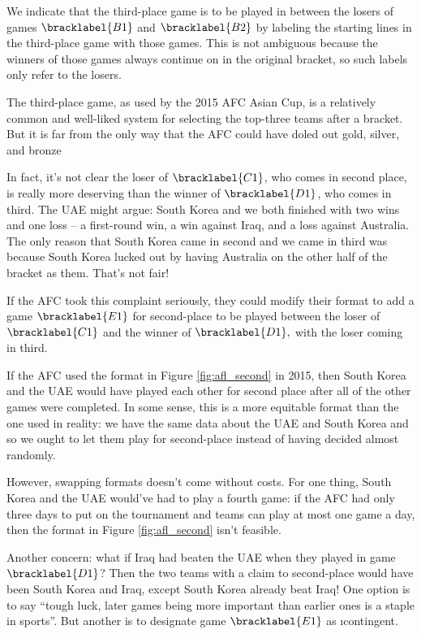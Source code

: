 {    We indicate that the third-place game is to be played in between the losers of games $\bracklabel{B1}$ and $\bracklabel{B2}$ by labeling the starting lines in the third-place game with those games. This is not ambiguous because the winners of those games always continue on in the original bracket, so such labels only refer to the losers.

    The third-place game, as used by the 2015 AFC Asian Cup, is a relatively common and well-liked system for selecting the top-three teams after a bracket. But it is far from the only way that the AFC could have doled out gold, silver, and bronze
    
    In fact, it's not clear the loser of $\bracklabel{C1}$, who comes in second place, is really more deserving than the winner of $\bracklabel{D1}$, who comes in third. The UAE might argue: South Korea and we both finished with two wins and one loss -- a first-round win, a win against Iraq, and a loss against Australia. The only reason that South Korea came in second and we came in third was because South Korea lucked out by having Australia on the other half of the bracket as them. That's not fair!

    If the AFC took this complaint seriously, they could modify their format to add a game $\bracklabel{E1}$ for second-place to be played between the loser of $\bracklabel{C1}$ and the winner of $\bracklabel{D1},$ with the loser coming in third.


    If the AFC used the format in Figure \ref{fig:afl_second} in 2015, then South Korea and the UAE would have played each other for second place after all of the other games were completed. In some sense, this is a more equitable format than the one used in reality: we have the same data about the UAE and South Korea and so we ought to let them play for second-place instead of having decided almost randomly.

    However, swapping formats doesn't come without costs. For one thing, South Korea and the UAE would've had to play a fourth game: if the AFC had only three days to put on the tournament and teams can play at most one game a day, then the format in Figure \ref{fig:afl_second} isn't feasible.

    Another concern: what if Iraq had beaten the UAE when they played in game $\bracklabel{D1}$? Then the two teams with a claim to second-place would have been South Korea and Iraq, except South Korea already beat Iraq! One option is to say ``tough luck, later games being more important than earlier ones is a staple in sports''. But another is to designate game $\bracklabel{E1}$ as \i{contingent}.

}
